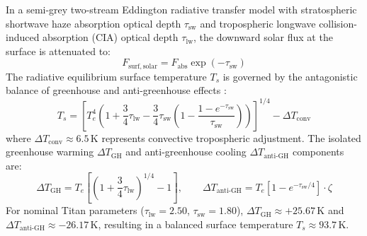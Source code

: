 \documentclass[11pt,a4paper]{article}
\begin{document}
In a semi-grey two-stream Eddington radiative transfer model with stratospheric shortwave haze absorption optical depth $\tau_{\mathrm{sw}}$ and tropospheric longwave collision-induced absorption (CIA) optical depth $\tau_{\mathrm{lw}}$, the downward solar flux at the surface is attenuated to:
\begin{equation}
F_{\mathrm{surf,solar}} = F_{\mathrm{abs}} \exp(-\tau_{\mathrm{sw}})
\end{equation}
The radiative equilibrium surface temperature $T_s$ is governed by the antagonistic balance of greenhouse and anti-greenhouse effects \cite{mckay1991,showman2006}:
\begin{equation}
T_s = \left[ T_e^4 \left( 1 + \frac{3}{4}\tau_{\mathrm{lw}} - \frac{3}{4}\tau_{\mathrm{sw}}\left(1 - \frac{1 - e^{-\tau_{\mathrm{sw}}}}{\tau_{\mathrm{sw}}}\right) \right) \right]^{1/4} - \Delta T_{\mathrm{conv}}
\end{equation}
where $\Delta T_{\mathrm{conv}} \approx 6.5\,\mathrm{K}$ represents convective tropospheric adjustment. The isolated greenhouse warming $\Delta T_{\mathrm{GH}}$ and anti-greenhouse cooling $\Delta T_{\mathrm{anti\text{-}GH}}$ components are:
\begin{equation}
\Delta T_{\mathrm{GH}} = T_e \left[ \left(1 + \frac{3}{4}\tau_{\mathrm{lw}}\right)^{1/4} - 1 \right], \qquad \Delta T_{\mathrm{anti\text{-}GH}} = T_e \left[ 1 - e^{-\tau_{\mathrm{sw}}/4} \right] \cdot \zeta
\end{equation}
For nominal Titan parameters ($\tau_{\mathrm{lw}} = 2.50$, $\tau_{\mathrm{sw}} = 1.80$), $\Delta T_{\mathrm{GH}} \approx +25.67\,\mathrm{K}$ and $\Delta T_{\mathrm{anti\text{-}GH}} \approx -26.17\,\mathrm{K}$, resulting in a balanced surface temperature $T_s \approx 93.7\,\mathrm{K}$.
\end{document}

